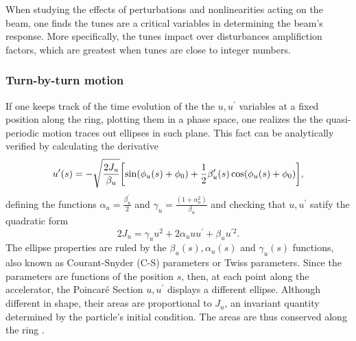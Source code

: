 When studying the effects of perturbations and nonlinearities acting on the beam, one finds the tunes are a critical variables in determining the beam's response. More specifically, the tunes impact over disturbances amplifiction factors, which are greatest when tunes are close to integer numbers.

\subsubsection{Turn-by-turn motion}
If one keeps track of the time evolution of the the $u, u^\prime$ variables at a fixed position along the ring, plotting them in a phase space, one realizes the the quasi-periodic motion traces out ellipses in such plane. This fact can be analytically verified by calculating the derivative
    \begin{equation}
        u^{\prime}(s) = - \sqrt{\frac{2J_u}{\beta_u}}\qty[\sin(\phi_u(s) + \phi_0) + \frac{1}{2}\beta_u^\prime(s)\cos(\phi_u(s) + \phi_0)],
        \label{eq:uprime}
    \end{equation}
    defining the functions $\alpha_u = \frac{\beta_u^\prime}{2}$  and $\gamma_u = \frac{(1+\alpha_u^2)}{\beta_u}$ and checking that $u, u^\prime$ satify the quadratic form
    \begin{equation}
        2J_u=\gamma_u u^{2}+2\alpha_u u u^{\prime}+\beta_u u^{\prime2}.
     \end{equation}
The ellipse properties are ruled by the $\beta_u(s), \alpha_u(s)$ and $\gamma_u(s)$ functions, also known as Courant-Snyder (C-S) parameters or Twiss parameters. Since the parameters are functions of the position $s$, then, at each point along the accelerator, the Poincaré Section $u, u^\prime$ displays a different ellipse. Although different in shape, their areas are proportional to $J_u$, an invariant quantity determined by the particle's initial condition. The areas are thus conserved along the ring \cite{lee_accelerator_2004,wiedemann_particle_2015}.

